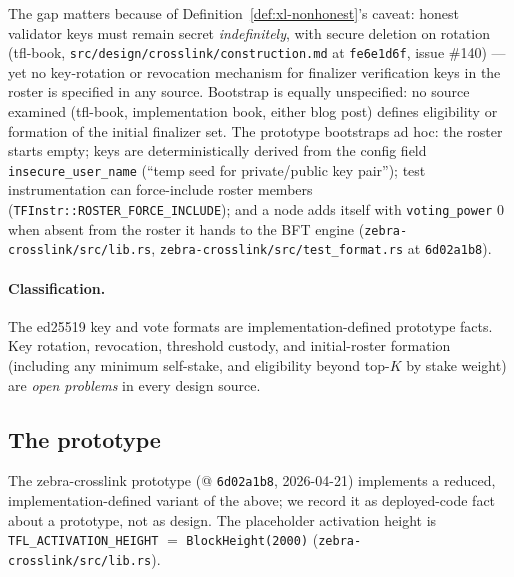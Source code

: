 \documentclass[11pt,a4paper]{article}
\theoremstyle{definition}
\begin{document}
The gap matters because of Definition~\ref{def:xl-nonhonest}'s caveat:
honest validator keys must remain secret \emph{indefinitely}, with secure
deletion on rotation (tfl-book,
\texttt{src/design/crosslink/construction.md} at \texttt{fe6e1d6f},
issue \#140) --- yet no key-rotation or revocation mechanism for
finalizer verification keys in the roster is specified in any source.
Bootstrap is equally unspecified: no source examined (tfl-book,
implementation book, either blog post) defines eligibility or formation
of the initial finalizer set. The prototype bootstraps ad hoc: the roster
starts empty; keys are deterministically derived from the config field
\texttt{insecure\_user\_name} (``temp seed for private/public key
pair''); test instrumentation can force-include roster members
(\texttt{TFInstr::ROSTER\_FORCE\_INCLUDE}); and a node adds itself with
\texttt{voting\_power} 0 when absent from the roster it hands to the BFT
engine (\texttt{zebra-crosslink/src/lib.rs},
\texttt{zebra-crosslink/src/test\_format.rs} at \texttt{6d02a1b8}).

\paragraph{Classification.} The ed25519 key and vote formats are
implementation-defined prototype facts. Key rotation, revocation,
threshold custody, and initial-roster formation (including any minimum
self-stake, and eligibility beyond top-$K$ by stake weight) are
\emph{open problems} in every design source.

\subsection{The prototype}\label{sec:xl-stake-prototype}

The zebra-crosslink prototype (@ \texttt{6d02a1b8}, 2026-04-21)
implements a reduced, implementation-defined variant of the above; we
record it as deployed-code fact about a prototype, not as design. The
placeholder activation height is \texttt{TFL\_ACTIVATION\_HEIGHT} $=$
\texttt{BlockHeight(2000)} (\texttt{zebra-crosslink/src/lib.rs}).
\end{document}
